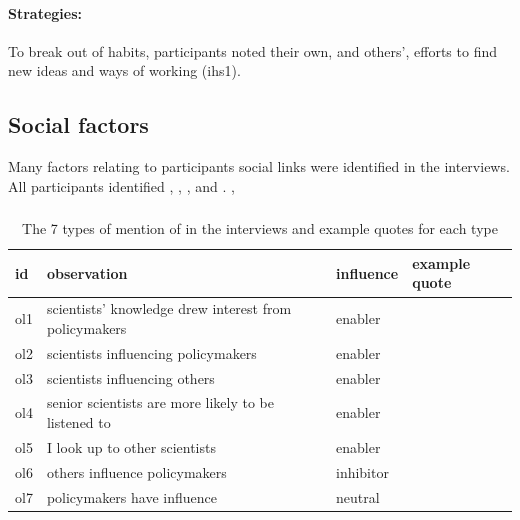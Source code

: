 \paragraph{Strategies:}
To break out of habits, participants noted their own, and others', efforts to find new ideas and ways of working (ihs1).
 
\subsection{Social factors}\label{sec:ressocial}

Many factors relating to participants social links were identified in the interviews. All participants identified \ismso, \ismsi, \ismsr, \ismsm{} and \ismsnr{}. ,  

\subsubsection{\ismso}\label{sec:resopinionleaders}

\begin{table}[!ht]
\footnotesize
\caption{The 7 types of mention of \ismso{} in the interviews and example quotes for each type}\label{tab:resopinionleaders}
\begin{tabular}{L{.08\linewidth}L{.3\linewidth}L{.1\linewidth}L{.42\linewidth}}\hline
\textbf{id} & \textbf{observation} & \textbf{influence} & \textbf{example quote} \\ \hline \hline 
ol1 & scientists' knowledge   drew interest from policymakers & enabler &   \\[5mm]
ol2 & scientists influencing policymakers & enabler &   \\[5mm]
ol3 & scientists influencing others & enabler &  \\[5mm]
ol4 & senior scientists are more likely to be   listened to & enabler &  \\[5mm]
ol5 & I look up to other scientists & enabler &  \\[5mm]
ol6 & others influence policymakers & inhibitor &  \\[5mm]
ol7 & policymakers have influence & neutral &  \\[5mm] \hline
\end{tabular}
\end{table}

